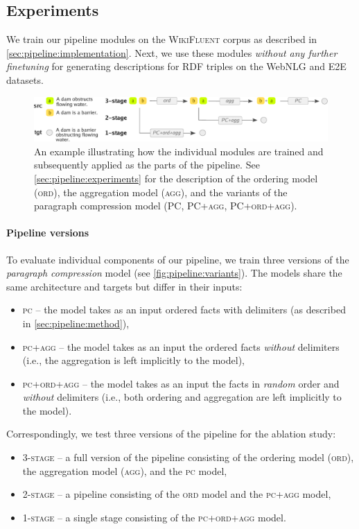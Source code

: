 \subsection{Experiments}
\label{sec:pipeline:experiments}
We train our pipeline modules on the \textsc{WikiFluent} corpus as described in \autoref{sec:pipeline:implementation}. Next, we use these modules \textit{without any further finetuning} for generating descriptions for RDF triples on the WebNLG and E2E datasets.


\begin{figure}[t]
    \centering
    \includegraphics[width=\textwidth]{img/pipeline-variants.pdf}

    \caption[Pipeline variants.]{An example illustrating how the individual modules are trained and subsequently applied as the parts of the pipeline. See \autoref{sec:pipeline:experiments} for the description of the ordering model (\textsc{ord}), the aggregation model (\textsc{agg}), and the variants of the paragraph compression model (\textsc{PC, PC+agg, PC+ord+agg}).}
    \label{fig:pipeline:variants}
\end{figure}


\paragraph{Pipeline versions} To evaluate individual components of our pipeline, we train three versions of the \textit{paragraph compression} model (see \autoref{fig:pipeline:variants}). The models share the same architecture and targets but differ in their inputs:
\begin{itemize}
    \item \textsc{\ac{pc}} -- the model takes as an input ordered facts with delimiters (as described in \autoref{sec:pipeline:method}),
    \item \textsc{\ac{pc}+agg} -- the model takes as an input the ordered facts \textit{without} delimiters (i.e., the aggregation is left implicitly to the model),
    \item \textsc{\ac{pc}+ord+agg} -- the model takes as an input the facts in \textit{random} order and \textit{without} delimiters (i.e., both ordering and aggregation are left implicitly to the model).
\end{itemize}
Correspondingly, we test three versions of the pipeline for the ablation study:
\begin{itemize}
    \item \textsc{3-stage} -- a full version of the pipeline consisting of the ordering model (\textsc{ord}), the aggregation model (\textsc{agg}), and the \textsc{\ac{pc}} model,
    \item \textsc{2-stage} -- a pipeline consisting of the \textsc{ord} model and the \textsc{\ac{pc}+agg} model,
    \item \textsc{1-stage} -- a single stage consisting of the \textsc{\ac{pc}+ord+agg} model.
\end{itemize}


